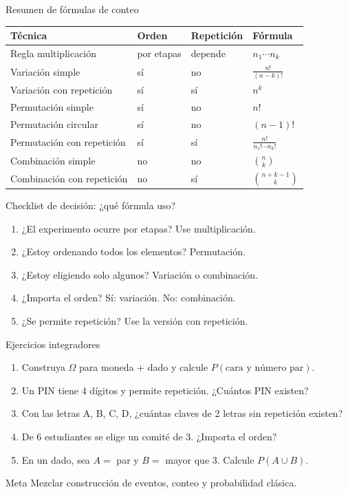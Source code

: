 \documentclass[aspectratio=169,11pt]{beamer}
\begin{document}
\begin{frame}{Resumen de fórmulas de conteo}
\small
\begin{center}
\begin{tabular}{p{}p{}p{}p{}}
\toprule
Técnica & Orden & Repetición & Fórmula \\
\midrule
Regla multiplicación & por etapas & depende & $n_1\cdots n_k$ \\
Variación simple & sí & no & $\frac{n!}{(n-k)!}$ \\
Variación con repetición & sí & sí & $n^k$ \\
Permutación simple & sí & no & $n!$ \\
Permutación circular & sí & no & $(n-1)!$ \\
Permutación con repetición & sí & sí & $\frac{n!}{n_1!\cdots n_k!}$ \\
Combinación simple & no & no & $\binom{n}{k}$ \\
Combinación con repetición & no & sí & $\binom{n+k-1}{k}$ \\
\bottomrule
\end{tabular}
\end{center}
\end{frame}

\begin{frame}{Checklist de decisión: ¿qué fórmula uso?}
\begin{enumerate}
  \item ¿El experimento ocurre por etapas? \pause Use multiplicación.
  \item ¿Estoy ordenando todos los elementos? \pause Permutación.
  \item ¿Estoy eligiendo solo algunos? \pause Variación o combinación.
  \item ¿Importa el orden? \pause Sí: variación. No: combinación.
  \item ¿Se permite repetición? \pause Use la versión con repetición.
\end{enumerate}
\end{frame}

\begin{frame}{Ejercicios integradores}
\small
\begin{enumerate}
  \item Construya $\Omega$ para moneda + dado y calcule $P(\text{cara y número par})$.
  \item Un PIN tiene 4 dígitos y permite repetición. ¿Cuántos PIN existen?
  \item Con las letras A, B, C, D, ¿cuántas claves de 2 letras sin repetición existen?
  \item De 6 estudiantes se elige un comité de 3. ¿Importa el orden?
  \item En un dado, sea $A=$ par y $B=$ mayor que 3. Calcule $P(A\cup B)$.
\end{enumerate}
\begin{exampleblock}{Meta}
Mezclar construcción de eventos, conteo y probabilidad clásica.
\end{exampleblock}
\end{frame}
\end{document}
